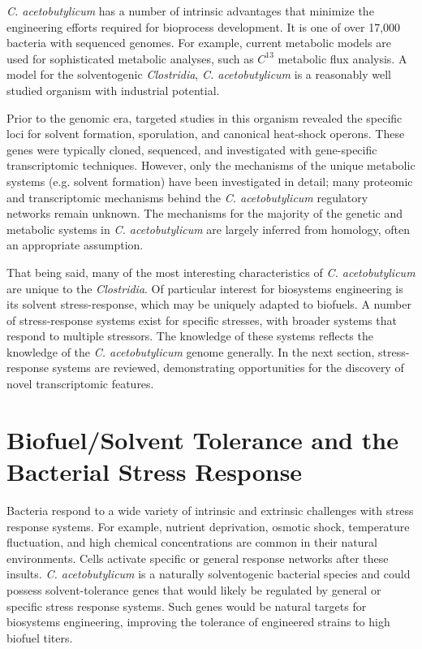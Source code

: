 \textit{C. acetobutylicum} has a number of intrinsic advantages that minimize the engineering efforts required for bioprocess development. It is one of over 17,000 bacteria with sequenced genomes.\cite{89,90,91} For example, current metabolic models\cite{100} are used for sophisticated metabolic analyses, such as $C^{13}$ metabolic flux analysis.\cite{99} A model for the solventogenic \textit{Clostridia}, \textit{C. acetobutylicum} is a reasonably well studied organism with industrial potential.

Prior to the genomic era, targeted studies in this organism revealed the specific loci for solvent formation,\cite{62,63,64,66,68,72,73} sporulation,\cite{125} and canonical heat-shock operons.\cite{76,80} These genes were typically cloned, sequenced, and investigated with gene-specific transcriptomic techniques. However, only the mechanisms of the unique metabolic systems (e.g. solvent formation) have been investigated in detail; many proteomic and transcriptomic mechanisms behind the \textit{C. acetobutylicum} regulatory networks remain unknown.\cite{126,42} The mechanisms for the majority of the genetic and metabolic systems in \textit{C. acetobutylicum} are largely inferred from homology, often an appropriate assumption.

That being said, many of the most interesting characteristics of \textit{C. acetobutylicum} are unique to the \textit{Clostridia}. Of particular interest for biosystems engineering is its solvent stress-response, which may be uniquely adapted to biofuels. A number of stress-response systems exist for specific stresses, with broader systems that respond to multiple stressors. The knowledge of these systems reflects the knowledge of the \textit{C. acetobutylicum} genome generally. In the next section, stress-response systems are reviewed, demonstrating opportunities for the discovery of novel transcriptomic features.

\section{Biofuel/Solvent Tolerance and the Bacterial Stress Response}


Bacteria respond to a wide variety of intrinsic and extrinsic challenges with stress response systems.\cite{11,24,77} For example, nutrient deprivation, osmotic shock, temperature fluctuation, and high chemical concentrations are common in their natural environments.\cite{11} Cells activate specific or general response networks after these insults. \textit{C. acetobutylicum} is a naturally solventogenic bacterial species and could possess solvent-tolerance genes that would likely be regulated by general or specific stress response systems. Such genes would be natural targets for biosystems engineering, improving the tolerance of engineered strains to high biofuel titers. 

